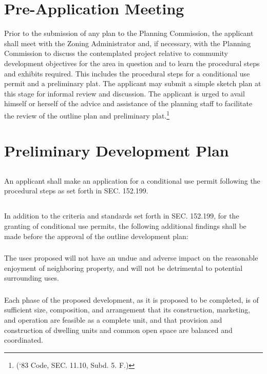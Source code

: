 \section{Pre-Application Meeting}
Prior to the submission of any plan to the Planning Commission, the applicant shall meet with the Zoning Administrator and, if necessary, with the Planning Commission to discuss the contemplated project relative to community development objectives for the area in question and to learn the procedural steps and exhibits required. This includes the procedural steps for a conditional use permit and a preliminary plat. The applicant may submit a simple sketch plan at this stage for informal review and discussion.  The applicant is urged to avail himself or herself of the advice and assistance of the planning staff to facilitate the review of the outline plan and preliminary plat.\footnote{(‘83 Code, SEC. 11.10, Subd. 5. F.)}

\section{Preliminary Development Plan}
\subsection{}
An applicant shall make an application for a conditional use permit following the procedural steps as set forth in SEC. 152.199.
\subsection{}
In addition to the criteria and standards set forth in SEC. 152.199, for the granting of conditional use permits, the following additional findings shall be made before the approval of the outline development plan:
\subsubsection{}
The uses proposed will not have an undue and adverse impact on the reasonable enjoyment of neighboring property, and will not be detrimental to potential surrounding uses.
\subsubsection{}
\subsubsection{}
Each phase of the proposed development, as it is proposed to be completed, is of sufficient size, composition, and arrangement that its construction, marketing, and operation are feasible as a complete unit, and that provision and construction of dwelling units and common open space are balanced and coordinated.
